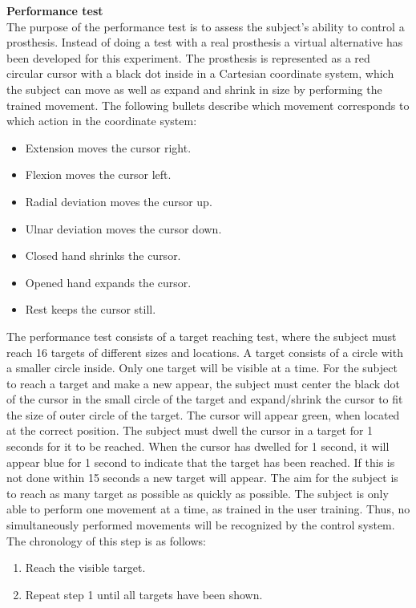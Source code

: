 \textbf{Performance test} \\
The purpose of the performance test is to assess the subject's ability to control a prosthesis. Instead of doing a test with a real prosthesis a virtual alternative has been developed for this experiment. The prosthesis is represented as a red circular cursor with a black dot inside in a Cartesian coordinate system, which the subject can move as well as expand and shrink in size by performing the trained movement. The following bullets describe which movement corresponds to which action in the coordinate system:

\begin{itemize}
	\item Extension moves the cursor right.
	\item Flexion moves the cursor left.
	\item Radial deviation moves the cursor up.
	\item Ulnar deviation moves the cursor down.
	\item Closed hand shrinks the cursor.
	\item Opened hand expands the cursor.
	\item Rest keeps the cursor still.
\end{itemize}

 The performance test consists of a target reaching test, where the subject must reach 16 targets of different sizes and locations. A target consists of a circle with a smaller circle inside. Only one target will be visible at a time. For the subject to reach a target and make a new appear, the subject must center the black dot of the cursor in the small circle of the target and expand/shrink the cursor to fit the size of outer circle of the target. The cursor will appear green, when located at the correct position. The subject must dwell the cursor in a target for 1 seconds for it to be reached. When the cursor has dwelled for 1 second, it will appear blue for 1 second to indicate that the target has been reached. If this is not done within 15 seconds a new target will appear. The aim for the subject is to reach as many target as possible as quickly as possible. The subject is only able to perform one movement at a time, as trained in the user training. Thus, no simultaneously performed movements will be recognized by the control system. The chronology of this step is as follows:

\begin{enumerate}
	\item Reach the visible target.
	\item Repeat step 1 until all targets have been shown.
\end{enumerate}

